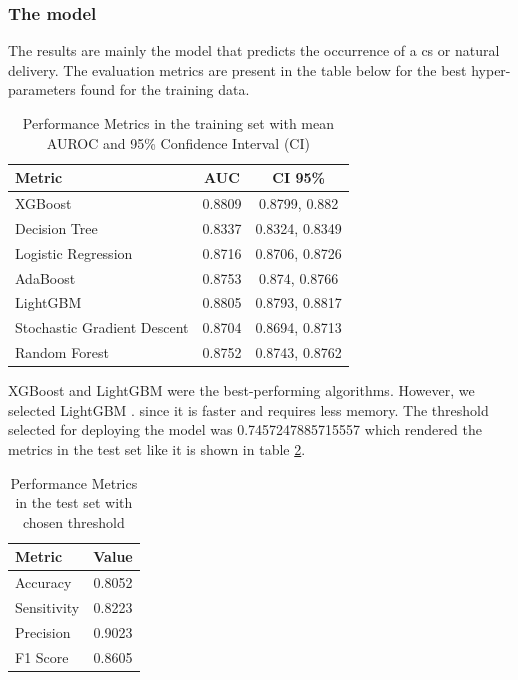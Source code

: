 \subsubsection{The model}
The results are mainly the model that predicts the occurrence of a \ac{cs} or natural delivery. 
The evaluation metrics are present in the table below for the best hyper-parameters found for the training data.

\begin{table}[htbp]
  \centering
  \caption[Performance Metrics in the training set]{Performance Metrics in the training set with mean AUROC and 95\% Confidence Interval (CI)}
  \label{tab:performance_metrics_auc}
  \renewcommand{\arraystretch}{1.5} %
  \setlength{\tabcolsep}{12pt} %
  \begin{tabular}{lcc}
    \hline
    \textbf{Metric} & \textbf{AUC} & \textbf{CI 95\%} \\
    \hline
    XGBoost & 0.8809 & 0.8799, 0.882 \\  
    Decision Tree & 0.8337 & 0.8324, 0.8349 \\
    Logistic Regression & 0.8716 & 0.8706, 0.8726 \\
    AdaBoost & 0.8753 & 0.874, 0.8766 \\ 
    LightGBM & 0.8805 & 0.8793, 0.8817 \\ 
    Stochastic Gradient Descent & 0.8704 & 0.8694, 0.8713 \\ 
    Random Forest & 0.8752 & 0.8743, 0.8762 \\  
    \hline
  \end{tabular}
\end{table}



XGBoost and LightGBM were the best-performing algorithms. However, we selected LightGBM \cite{lightgbm}. since it is faster and requires less memory. The threshold selected for deploying the model was 0.7457247885715557 which rendered the metrics in the test set like it is shown in table \ref{tab:performance_metrics_threshold}.

\begin{table}[htbp]
  \centering
  \caption{Performance Metrics in the test set with chosen threshold}
  \label{tab:performance_metrics_threshold}
  \renewcommand{\arraystretch}{1.5} %
  \setlength{\tabcolsep}{12pt} %
  \begin{tabular}{lc}
    \hline
    \textbf{Metric} & \textbf{Value} \\
    \hline
    Accuracy & 0.8052 \\
    Sensitivity & 0.8223 \\
    Precision & 0.9023 \\
    F1 Score & 0.8605 \\
    \hline
  \end{tabular}
\end{table}





